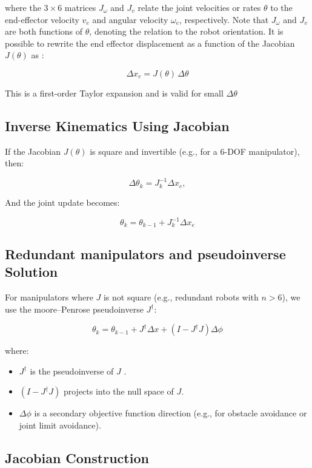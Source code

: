 \documentclass[12pt]{article}
\begin{document}
where the $3\times6$ matrices $J_\omega$ and $J_v$ relate the joint velocities or rates $\theta$ to the end-effector velocity $v_e$ and angular velocity $\omega_e$, respectively. Note that $J_\omega$ and $J_v$ are both functions of $\theta$, denoting the relation to the robot orientation. It is possible to rewrite the end effector displacement as a function of the Jacobian $J(\theta)$ as \cite{ref19}:

  \[
    \Delta x_e = J(\theta) \, \Delta \theta 
  \]

This is a first-order Taylor expansion and is valid for small $\Delta \theta$
\newpage
\subsection{Inverse Kinematics Using Jacobian}

If the Jacobian $J(\theta)$ is square and invertible (e.g., for a 6-DOF manipulator), then:\cite{ref19}

  \[
    \Delta \theta_k = J_k^{-1} \Delta x_e ,
  \]

And the joint update becomes:

  \[
    \theta_k = \theta_{k-1} + J_k^{-1} \Delta x_e  
  \]

\subsection{Redundant manipulators and pseudoinverse Solution}

For manipulators where $J$ is not square (e.g., redundant robots with $n > 6$), we use the moore–Penrose pseudoinverse $J^\dagger$:\cite{ref19}

  \[
    \theta_k = \theta_{k-1} + J^\dagger \Delta x + (I - J^\dagger J)\Delta \phi 
  \]

where:
\begin{itemize}
    \item $J^\dagger$ is the pseudoinverse of $J$ \cite{ref19}. 
    \item $(I - J^\dagger J)$ projects into the null space of $J$\cite{ref19}.
    \item $\Delta \phi$ is a secondary objective function direction (e.g., for obstacle avoidance or joint limit avoidance)\cite{ref19}.
\end{itemize}

\subsection{Jacobian Construction}
\end{document}
